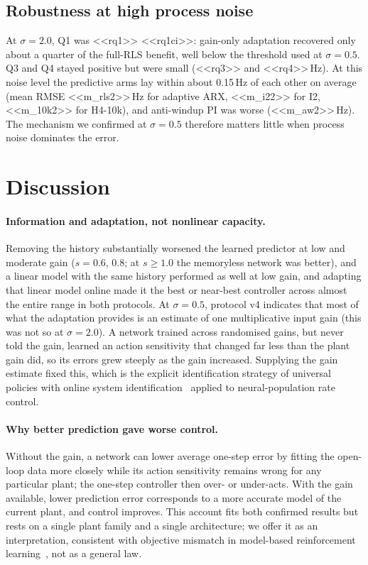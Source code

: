 \documentclass[11pt]{article}
\newcommand{\Hz}{\,Hz}
\begin{document}
\subsection{Robustness at high process noise}
At $\sigma=2.0$, Q1 was <<rq1>> <<rq1ci>>: gain-only adaptation recovered only about a quarter of the full-RLS benefit, well below the threshold used at $\sigma=0.5$. Q3 and Q4 stayed positive but were small (<<rq3>> and <<rq4>>\Hz). At this noise level the predictive arms lay within about 0.15\Hz{} of each other on average (mean RMSE <<m_rls2>>\Hz{} for adaptive ARX, <<m_i22>> for I2, <<m_10k2>> for H4-10k), and anti-windup PI was worse (<<m_aw2>>\Hz). The mechanism we confirmed at $\sigma=0.5$ therefore matters little when process noise dominates the error.

\section{Discussion}
\paragraph{Information and adaptation, not nonlinear capacity.} Removing the history substantially worsened the learned predictor at low and moderate gain ($s=0.6$, $0.8$; at $s\ge1.0$ the memoryless network was better), and a linear model with the same history performed as well at low gain, and adapting that linear model online made it the best or near-best controller across almost the entire range in both protocols. At $\sigma=0.5$, protocol v4 indicates that most of what the adaptation provides is an estimate of one multiplicative input gain (this was not so at $\sigma=2.0$). A network trained across randomised gains, but never told the gain, learned an action sensitivity that changed far less than the plant gain did, so its errors grew steeply as the gain increased. Supplying the gain estimate fixed this, which is the explicit identification strategy of universal policies with online system identification~\cite{yu2017} applied to neural-population rate control.

\paragraph{Why better prediction gave worse control.} Without the gain, a network can lower average one-step error by fitting the open-loop data more closely while its action sensitivity remains wrong for any particular plant; the one-step controller then over- or under-acts. With the gain available, lower prediction error corresponds to a more accurate model of the current plant, and control improves. This account fits both confirmed results but rests on a single plant family and a single architecture; we offer it as an interpretation, consistent with objective mismatch in model-based reinforcement learning~\cite{lambert2020,grimm2020}, not as a general law.
\end{document}
